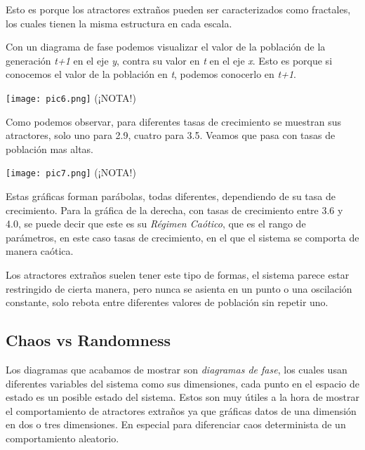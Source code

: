 \documentclass{article}
\begin{document}
Esto es porque los atractores extraños pueden ser caracterizados como fractales, los cuales tienen la misma estructura en cada escala.

\vspace{0.3cm}

Con un diagrama de fase podemos visualizar el valor de la población de la generación \textit{t+1} en el eje \textit{y}, contra su valor en \textit{t} en el eje \textit{x}.
Esto es porque si conocemos el valor de la población en \textit{t}, podemos conocerlo en \textit{t+1}.

\begin{center}
	\texttt{[image: pic6.png]}
    (¡NOTA!)
\end{center}
\vspace{0.3cm}

Como podemos observar, para diferentes tasas de crecimiento se muestran sus atractores, solo uno para 2.9, cuatro para 3.5.
Veamos que pasa con tasas de población mas altas.

\begin{center}
	\texttt{[image: pic7.png]}
    (¡NOTA!)
\end{center}
\vspace{0.3cm}

Estas gráficas forman parábolas, todas diferentes, dependiendo de su tasa de crecimiento. Para la gráfica de la derecha, con tasas de crecimiento entre 3.6 y 4.0, se puede decir que este es su \textit{Régimen Caótico}, que es el rango de parámetros, en este caso tasas de crecimiento, en el que el sistema se comporta de manera caótica.

Los atractores extraños suelen tener este tipo de formas, el sistema parece estar restringido de cierta manera, pero nunca se asienta en un punto o una oscilación constante, solo rebota entre diferentes valores de población sin repetir uno. 

\subsection{Chaos vs Randomness}

Los diagramas que acabamos de mostrar son \textit{diagramas de fase}, los cuales usan diferentes variables del sistema como sus dimensiones, cada punto en el espacio de estado es un posible estado del sistema.
Estos son muy útiles a la hora de mostrar el comportamiento de atractores extraños ya que gráficas datos de una dimensión en dos o tres dimensiones. En especial para diferenciar caos determinista de un comportamiento aleatorio.
\end{document}
